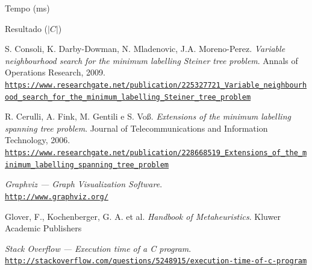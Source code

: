 \documentclass[12pt, a4paper]{article}
\begin{document}
\begin{table}[h]
\centering
\tiny

\caption{Tempo (ms)}
\normalsize
\end{table}

\begin{table}[h]
\centering
\tiny

\caption{Resultado ($ |C| $)}
\normalsize
\end{table}


\begin{thebibliography}{9}

S. Consoli, K. Darby-Dowman, N. Mladenovic, J.A. Moreno-Perez.
\textit{Variable neighbourhood search for the minimum labelling Steiner tree
problem}.
Annals of Operations Research, 2009.
\tiny
\\\texttt{\url{https://www.researchgate.net/publication/225327721_Variable_neighbourhood_search_for_the_minimum_labelling_Steiner_tree_problem}}
\normalsize

R. Cerulli, A. Fink, M. Gentili e S. Voß.
\textit{Extensions of the minimum labelling spanning tree problem}.
Journal of Telecommunications and Information Technology, 2006.
\tiny
\\\texttt{\url{https://www.researchgate.net/publication/228668519_Extensions_of_the_minimum_labelling_spanning_tree_problem}}
\normalsize

\textit{Graphviz --- Graph Visualization Software}. \\
\tiny
\texttt{\url{http://www.graphviz.org/}}
\normalsize

Glover, F., Kochenberger, G. A. et al.
\textit{Handbook of Metaheuristics}.
Kluwer Academic Publishers

\textit{Stack Overflow --- Execution time of a C program}. \\
\tiny
\texttt{\url{http://stackoverflow.com/questions/5248915/execution-time-of-c-program}}
\normalsize

\end{thebibliography}
\end{document}
